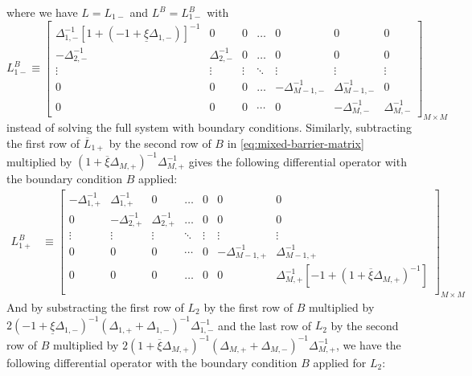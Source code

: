 \documentclass[11pt]{article}
\theoremstyle{definition}
\begin{document}
where we have ${L} = {L}_{1-}$ and $L^B = L_{1-}^B$ with
\begin{equation}
L_{1-}^B \equiv \begin{bmatrix}
\Delta_{1,-}^{-1} [1 + (-1 + \underline{\xi} \Delta_{1,-})]^{-1} &0&0&\dots&0&0&0\\
-\Delta_{2,-}^{-1}&\Delta_{2,-}^{-1}&0&\dots&0&0&0\\
\vdots&\vdots&\vdots&\ddots&\vdots&\vdots&\vdots\\
0&0&0&\dots&-\Delta_{M-1,-}^{-1}&\Delta_{M-1,-}^{-1}&0\\
0&0&0&\cdots&0&-\Delta_{M,-}^{-1}&\Delta_{M,-}^{-1}
\end{bmatrix}_{M\times M}
\end{equation}
instead of solving the full system with boundary conditions. Similarly, subtracting the first row of $\overline{L}_{1+}$ by the second row of $B$ in \eqref{eq:mixed-barrier-matrix} multiplied by $(1 + \overline{\xi} \Delta_{M,+})^{-1} \Delta_{M,+}^{-1}$ gives the following differential operator with the boundary condition $B$ applied:
\begin{align}
L_{1+}^B &\equiv \begin{bmatrix}
-\Delta_{1,+}^{-1}&\Delta_{1,+}^{-1}&0&\dots&0&0&0\\
0&-\Delta_{2,+}^{-1}&\Delta_{2,+}^{-1}&\dots&0&0&0\\
\vdots&\vdots&\vdots&\ddots&\vdots&\vdots&\vdots\\
0&0&0&\cdots&0&-\Delta_{M-1,+}^{-1}&\Delta_{M-1,+}^{-1}\\
0&0&0&\dots&0&0&\Delta_{M,+}^{-1}  [-1 + (1 + \overline{\xi} \Delta_{M,+})^{-1}]  \\
\end{bmatrix}_{M\times M}\label{eq:L-1-plus}
\end{align}
And by substracting the first row of $L_2$ by the first row of $B$ multiplied by $2(-1 + \underline{\xi} \Delta_{1,-} )^{-1} (\Delta_{1,+} + \Delta_{1,-})^{-1}  \Delta_{1,-}^{-1} $ and the last row of $L_2$ by the second row of $B$ multiplied by $2(1 + \overline{\xi} \Delta_{M,+} )^{-1} (\Delta_{M,+} + \Delta_{M,-})^{-1}  \Delta_{M,+}^{-1}$, we have the following differential operator with the boundary condition $B$ applied for $L_2$:
\end{document}
